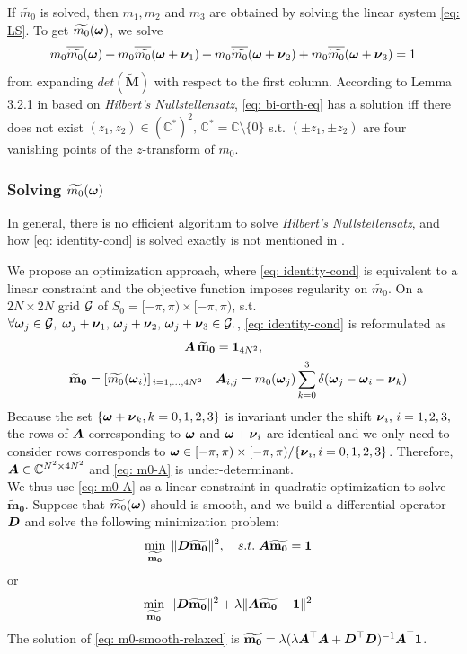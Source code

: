 If $\widetilde{m_0}$ is solved, then $m_1,m_2$ and $m_3$ are obtained by solving the linear system \eqref{eq: LS}.
To get $\widetilde{m_{0}}(\boldsymbol{\omega})$, we solve 
\begin{align}\label{eq: bi-orth-eq}
m_0\overline{\widetilde{m_{0}}}(\boldsymbol{\omega}) + m_0\overline{\widetilde{m_{0}}}(\boldsymbol{\omega} + \boldsymbol{\nu}_{1}) + m_0\overline{\widetilde{m_{0}}}(\boldsymbol{\omega} + \boldsymbol{\nu}_{2}) + m_0\overline{\widetilde{m_{0}}}(\boldsymbol{\omega} + \boldsymbol{\nu}_{3}) = 1
\end{align}
from expanding $det(\widetilde{\mathbf{M}})$ with respect to the first column.
According to Lemma 3.2.1 in \cite{cohen1993compactly} based on {\it Hilbert's Nullstellensatz}, \eqref{eq: bi-orth-eq} has a solution iff there does not exist $(z_1,z_2)\in (\mathbb{C}^*)^2,\, \mathbb{C}^* = \mathbb{C}\setminus\{0\}$ s.t. $(\pm z_1,\pm z_2)$ are four 
vanishing points of the $z$-transform of $m_0$.

\subsubsection{Solving $\widetilde{m_{0}}(\boldsymbol{\omega})$}
In general, there is no efficient algorithm to solve {\it Hilbert's Nullstellensatz}, and how \eqref{eq: identity-cond} is solved exactly is not mentioned in \cite{cohen1993compactly}.

We propose an optimization approach, where \eqref{eq: identity-cond} is equivalent to a linear constraint and the objective function imposes regularity on $\widetilde{m_0}$.
On a $2N\times 2N$ grid $\mathcal{G}$ of $S_0 = [-\pi, \pi)\times[-\pi, \pi)$, s.t. $\forall \boldsymbol{\omega}_j \in \mathcal{G}, \; \boldsymbol{\omega}_j+\boldsymbol{\nu}_1,\,\boldsymbol{\omega}_j+\boldsymbol{\nu}_2,\,\boldsymbol{\omega}_j+\boldsymbol{\nu}_3 \in \mathcal{G}.$, \eqref{eq: identity-cond} is reformulated as
\begin{align}
\hspace*{10em} \V{A}\, \mathbf{\widetilde{m}_0}&= \mathbf{1}_{4N^2}, \label{eq: m0-A}\\ 
\mathbf{\widetilde{m}_0} = [\widetilde{m_0}(\V{\omega}_i)]_{\,i=1,\hdots,4N^2} \quad &\V{A}_{i,j} = m_0(\V{\omega}_j)\sum_{k=0}^3\delta(\V{\omega}_j-\V{\omega}_i-\V{\nu}_k) \notag
\end{align}
Because the set $\{\boldsymbol{\omega}+\boldsymbol{\nu}_k,k=0,1,2,3\}$ is invariant under the shift $\boldsymbol{\nu}_i,\, i = 1,2,3,$ the rows of $\boldsymbol{A}$ corresponding to $\boldsymbol{\omega}$ and $\boldsymbol{\omega}+\boldsymbol{\nu}_i$ are identical and we only need to consider rows corresponds to $\boldsymbol{\omega}\in [-\pi,\pi)\times[-\pi,\pi)/\{\boldsymbol{\nu}_i,i=0,1,2,3\}$. Therefore, $\boldsymbol{A}\in \mathbb{C}^{N^2\times 4N^2}$ and \eqref{eq: m0-A} is under-determinant. \\
We thus use \eqref{eq: m0-A} as a linear constraint in quadratic optimization to solve $\mathbf{\widetilde{m}_0}$. Suppose that $\widetilde{m_{0}}(\boldsymbol{\omega})$ should is smooth, and we build a differential operator $\boldsymbol{D}$ and solve the following minimization problem:
\begin{align}
&\min_{\mathbf{\widetilde{m_{0}}}}\; \Vert \boldsymbol{D}\mathbf{\widetilde{m_{0}}}\Vert^2,\quad s.t. \; \boldsymbol{A}\mathbf{\widetilde{m_{0}}} = \mathbf{1} \label{eq: opt-diff}
\end{align}
or
\begin{align}
&\min_{\mathbf{\widetilde{m_{0}}}}\; \Vert \boldsymbol{D}\mathbf{\widetilde{m_{0}}}\Vert^2 + \lambda \Vert \boldsymbol{A}\mathbf{\widetilde{m_{0}}} - \mathbf{1}\Vert^2 \label{eq: m0-smooth-relaxed}
\end{align}
The solution of \eqref{eq: m0-smooth-relaxed} is $\mathbf{\widetilde{m_{0}}} = \lambda(\lambda \boldsymbol{A}^\top \boldsymbol{A} + \boldsymbol{D}^\top \boldsymbol{D})^{-1}\boldsymbol{A}^\top\mathbf{1}$.


